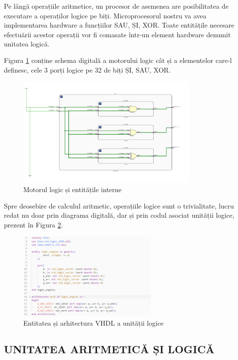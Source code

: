 \documentclass[12pt]{article}
\begin{document}
 Pe lângă operațiile aritmetice, un procesor de asemenea are posibilitatea de executare a operaților logice pe biți. Microprocesorul nostru va avea implementarea hardware a funcțiilor SAU, ȘI, XOR. Toate entitățile necesare efectuării acestor operații vor fi comasate într-un element hardware denumit unitatea logică.
 
Figura \ref{Figura:20} conține schema digitală a motorului logic cât și a elementelor care-l definesc, cele 3 porți logice pe 32 de biți ȘI, SAU, XOR.
  \begin{figure}[h!]
 \includegraphics[width=0.81\textwidth]{LogicEngine.png}
 \centering
 \caption{Motorul logic și entitățile interne}
 \label{Figura:20}
 \end{figure}

Spre deosebire de calculul aritmetic, operațiile logice sunt o trivialitate, lucru redat nu doar prin diagrama digitală, dar și prin codul asociat unității logice, prezent în Figura \ref{Figura:27}.

 \begin{figure}[h!]
 \includegraphics[width=0.62\textwidth]{logicengineVHDL.png}
 \centering
 \caption{Entitatea și arhitectura VHDL a unității logice}
 \label{Figura:27}
 \end{figure}
 
\newpage
\subsection{UNITATEA ARITMETICĂ ȘI LOGICĂ}
\end{document}
